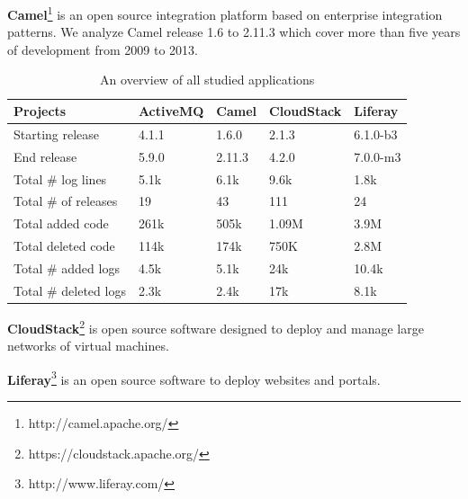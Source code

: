 
\textbf{Camel}\footnote[2]{http://camel.apache.org/} is an open source integration platform based on enterprise integration patterns. We analyze Camel release 1.6 to 2.11.3 which cover more than five years of development from 2009 to 2013. 

\begin{table}[tbh]
	\centering \protect\protect\caption{An overview of all studied applications}
	
	
	\label{tba:overviewsystems} %
	\begin{tabular}{lllll}
		\hline 
		Projects  & ActiveMQ  & Camel  & CloudStack  & Liferay \tabularnewline
		\hline 
		Starting release  & 4.1.1  & 1.6.0  & 2.1.3  & 6.1.0-b3 \tabularnewline
		End release  & 5.9.0  & 2.11.3  & 4.2.0  & 7.0.0-m3 \tabularnewline
		Total \# log lines  & 5.1k  & 6.1k  & 9.6k  & 1.8k \tabularnewline
		Total \# of releases  & 19  & 43  & 111  & 24 \tabularnewline
		Total added code  & 261k  & 505k  & 1.09M  & 3.9M \tabularnewline
		Total deleted code  & 114k  & 174k  & 750K  & 2.8M \tabularnewline
		Total \# added logs  & 4.5k  & 5.1k  & 24k  & 10.4k \tabularnewline
		Total \# deleted logs  & 2.3k  & 2.4k  & 17k  & 8.1k \tabularnewline
		\hline 
	\end{tabular}
\end{table}


\textbf{CloudStack}\footnote[3]{https://cloudstack.apache.org/} is open source software designed to deploy and manage large networks of virtual machines. 


\textbf{Liferay}\footnote[4]{http://www.liferay.com/} is an open source software to deploy websites and portals. 

  

